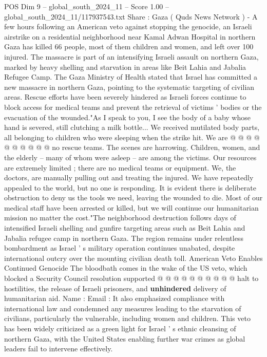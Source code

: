 \begin{textsample}{POS Dim 9 – global\_south\_2024\_11 – Score 1.00 – global\_south\_2024\_11/117937543.txt}  \label{ex:f9_pos_146}
Share : Gaza ( Quds News Network ) - A few hours following an American veto against stopping the genocide, an Israeli airstrike on a residential neighborhood near Kamal Adwan Hospital in northern Gaza has killed 66 people, most of them children and women, and left over 100 injured.
The massacre is part of an intensifying Israeli assault on northern Gaza, marked by heavy shelling and starvation in areas like Beit Lahia and Jabalia Refugee Camp.
The Gaza Ministry of Health stated that Israel has committed a new massacre in northern Gaza, pointing to the systematic targeting of civilian areas.
Rescue efforts have been severely hindered as Israeli forces continue to block access for medical teams and prevent the retrieval of victims ' bodies or the evacuation of the wounded."As I speak to you, I see the body of a baby whose hand is severed, still clutching a milk bottle...
We received mutilated body parts, all belonging to children who were sleeping when the strike hit.
We are @ @ @ @ @ @ @ @ @ @ no rescue teams.
The scenes are harrowing.
Children, women, and the elderly -- many of whom were asleep -- are among the victims.
Our resources are extremely limited ; there are no medical teams or equipment.
We, the doctors, are manually pulling out and treating the injured.
We have repeatedly appealed to the world, but no one is responding.
It is evident there is deliberate obstruction to deny us the tools we need, leaving the wounded to die.
Most of our medical staff have been arrested or killed, but we will continue our humanitarian mission no matter the cost."The neighborhood destruction follows days of intensified Israeli shelling and gunfire targeting areas such as Beit Lahia and Jabalia refugee camp in northern Gaza.
The region remains under relentless bombardment as Israel ' s military operation continues unabated, despite international outcry over the mounting civilian death toll.
American Veto Enables Continued Genocide The bloodbath comes in the wake of the US veto, which blocked a Security Council resolution supported @ @ @ @ @ @ @ @ @ @ halt to hostilities, the release of Israeli prisoners, and \textbf{unhindered} delivery of humanitarian aid.
Name : Email : It also emphasized compliance with international law and condemned any measures leading to the starvation of civilians, particularly the vulnerable, including women and children.
This veto has been widely criticized as a green light for Israel ' s ethnic cleansing of northern Gaza, with the United States enabling further war crimes as global leaders fail to intervene effectively.

\end{textsample}
